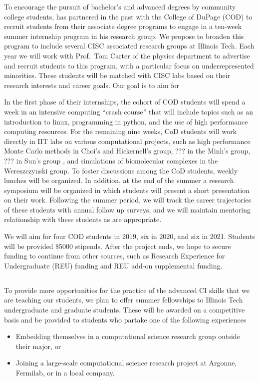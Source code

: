 \documentclass[11pt]{NSFamsart}
\begin{document}
To  encourage the pursuit of bachelor's and advanced degrees by community college students, \JW has partnered in the past with the College of DuPage (COD) to recruit students from their associate degree programs  to engage in a ten-week summer internship program in his research group.  We propose to broaden this program to include several CISC associated research groups at Illinois Tech. Each year we will work with Prof.~Tom Carter of the physics department to advertise and recruit students to this program,  with a particular focus on underrepresented minorities.  These students will be matched with CISC labs based on their research interests and career goals.  Our goal is to aim for 

In the first phase of their internships, the cohort of COD students will spend a week in an intensive computing ``crash course'' that will include topics such as an introduction to linux, programming in python, and the use of high performance computing resources.  For the remaining nine weeks, CoD students will work directly in IIT labs on various computational projects, such as high performance Monte Carlo methods in Choi's and Hickernell's group, ??? in the Minh's group, ??? in Sun's group , and simulations of biomolecular complexes in the Wereszczynski group.  To foster discussions among the CoD students, weekly lunches will be organized.  In addition, at the end of the summer a research symposium will be organized in which students will present a short presentation on their work.  Following the summer period, we will track the career trajectories of these students with annual follow up surveys, and we will maintain mentoring relationship with these students as are appropriate. 

We will aim for four COD students in 2019, six in 2020, and six in 2021.  Students will be provided \$5000 stipends.  After the project ends, we hope to secure funding to continue from other sources, such as Research Experience for Undergraduate (REU) funding and REU add-on supplemental funding.


\subsection{\FellowName} \label{Fellow}
To provide more opportunities for the practice of the advanced CI skills that we are teaching our students, we plan to offer summer fellowships to Illinois Tech undergraduate and graduate students.  These will be awarded on a competitive basis and be provided to students who partake one of the following experiences
\begin{itemize}
\item Embedding themselves in a computational science research group outside their major, or
\item Joining a large-scale computational science research project at Argonne, Fermilab, or in a local company.
\end{itemize}
\end{document}

